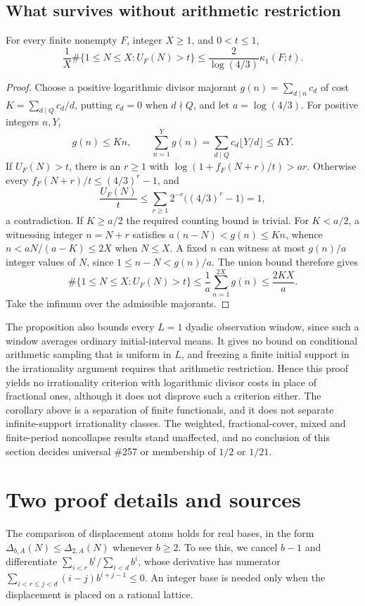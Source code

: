 \subsection{What survives without arithmetic restriction}
\begin{prop}\label{prop:257-logarithmic-initial-interval}
For every finite nonempty $F$, integer $X\ge1$, and $0<t\le1$,
\[
 \frac1X\#\{1\le N\le X:U_F(N)>t\}
 \le\frac{2}{\log(4/3)}\kappa_1(F;t).
\]
\end{prop}
\begin{proof}
Choose a positive logarithmic divisor majorant
$g(n)=\sum_{d\mid n}c_d$ of cost $K=\sum_{d\mid Q}c_d/d$, putting
$c_d=0$ when $d\nmid Q$, and let $a=\log(4/3)$.
For positive integers $n,Y$,
\[
 g(n)\le Kn,\qquad
 \sum_{n=1}^{Y}g(n)=\sum_{d\mid Q}c_d\lfloor Y/d\rfloor\le KY.
\]
If $U_F(N)>t$, there is an $r\ge1$ with
$\log(1+f_F(N+r)/t)>ar$.
Otherwise every $f_F(N+r)/t\le(4/3)^r-1$, and
\[
 \frac{U_F(N)}t\le\sum_{r\ge1}2^{-r}\bigl((4/3)^r-1\bigr)=1,
\]
a contradiction.
If $K\ge a/2$ the required counting bound is trivial.
For $K<a/2$, a witnessing integer $n=N+r$ satisfies
$a(n-N)<g(n)\le Kn$, whence $n<aN/(a-K)\le2X$ when $N\le X$.
A fixed $n$ can witness at most $g(n)/a$ integer values of
$N$, since $1\le n-N<g(n)/a$.
The union bound therefore gives
\[
 \#\{1\le N\le X:U_F(N)>t\}
 \le\frac1a\sum_{n=1}^{2X}g(n)\le\frac{2KX}{a}.
\]
Take the infimum over the admissible majorants.
\end{proof}

The proposition also bounds every $L=1$ dyadic observation window, since
such a window averages ordinary initial-interval means.  It gives no bound
on conditional arithmetic sampling that is uniform in $L$, and freezing a finite
initial support in the irrationality argument requires that
arithmetic restriction.  Hence this proof yields no irrationality criterion with logarithmic
divisor costs in place of fractional ones, although it does not disprove such a criterion either.
The corollary above is a separation of finite functionals, and it does not
separate infinite-support irrationality classes.  The weighted, fractional-cover, mixed and
finite-period noncollapse results stand unaffected, and no conclusion of this section
decides universal \#257 or membership of $1/2$ or $1/21$.

\clearpage
\section*{Two proof details and sources}
The comparison of displacement atoms holds for real bases, in the form
$\Delta_{b,A}(N)\le\Delta_{2,A}(N)$ whenever $b\ge2$.
To see this, we cancel $b-1$ and differentiate
$\sum_{i<r}b^i/\sum_{i<d}b^i$, whose derivative has numerator
$\sum_{i<r\le j<d}(i-j)b^{i+j-1}\le0$.
An integer base is needed only when the displacement is placed on a
rational lattice.

